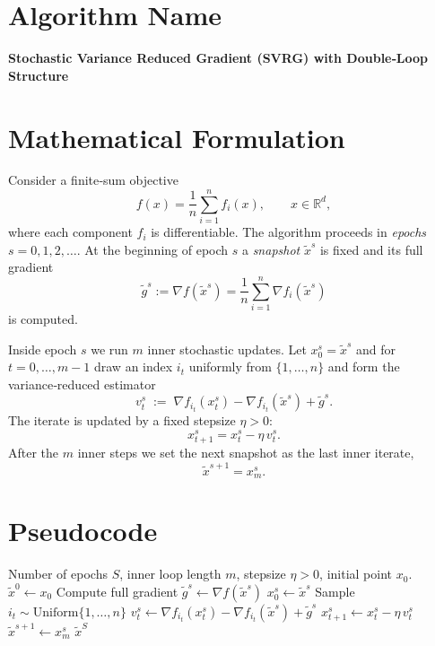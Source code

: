 \documentclass{article}
\newcommand{\R}{\mathbb{R}}
\begin{document}
\section*{Algorithm Name}
\textbf{Stochastic Variance Reduced Gradient (SVRG) with Double‑Loop Structure}

\section*{Mathematical Formulation}
Consider a finite‑sum objective
\[
f(x)=\frac{1}{n}\sum_{i=1}^{n}f_i(x),\qquad x\in\R^{d},
\]
where each component $f_i$ is differentiable.  
The algorithm proceeds in \emph{epochs} $s=0,1,2,\dots$.  
At the beginning of epoch $s$ a \emph{snapshot} $\tilde{x}^{s}$ is fixed and its full gradient
\[
\tilde{g}^{s}:=\nabla f(\tilde{x}^{s})=\frac{1}{n}\sum_{i=1}^{n}\nabla f_i(\tilde{x}^{s})
\]
is computed.  

Inside epoch $s$ we run $m$ inner stochastic updates.  Let $x_0^{s}= \tilde{x}^{s}$ and for
$t=0,\dots,m-1$ draw an index $i_t$ uniformly from $\{1,\dots,n\}$ and form the
variance‑reduced estimator
\[
v_t^{s}\;:=\;\nabla f_{i_t}(x_t^{s})-\nabla f_{i_t}(\tilde{x}^{s})+\tilde{g}^{s}.
\tag{1}
\]
The iterate is updated by a fixed stepsize $\eta>0$:
\[
x_{t+1}^{s}=x_t^{s}-\eta\,v_t^{s}. \tag{2}
\]
After the $m$ inner steps we set the next snapshot as the last inner iterate,
\[
\tilde{x}^{s+1}=x_{m}^{s}. \tag{3}
\]

\section*{Pseudocode}
\begin{algorithm}[H]
\caption{SVRG (double‑loop)}\label{alg:svrg}
\begin{algorithmic}[1]
\Require Number of epochs $S$, inner loop length $m$, stepsize $\eta>0$, initial point $x_0$.
\State $\tilde{x}^{0}\gets x_0$
    \State Compute full gradient $\tilde{g}^{s}\gets \nabla f(\tilde{x}^{s})$ 
    \State $x_0^{s}\gets \tilde{x}^{s}$
        \State Sample $i_t\sim\text{Uniform}\{1,\dots,n\}$
        \State $v_t^{s}\gets \nabla f_{i_t}(x_t^{s})-\nabla f_{i_t}(\tilde{x}^{s})+\tilde{g}^{s}$ 
        \State $x_{t+1}^{s}\gets x_t^{s}-\eta\,v_t^{s}$ 
    \EndFor
    \State $\tilde{x}^{s+1}\gets x_{m}^{s}$ 
\EndFor
\State \Return $\tilde{x}^{S}$
\end{algorithmic}
\end{algorithm}
\end{document}

